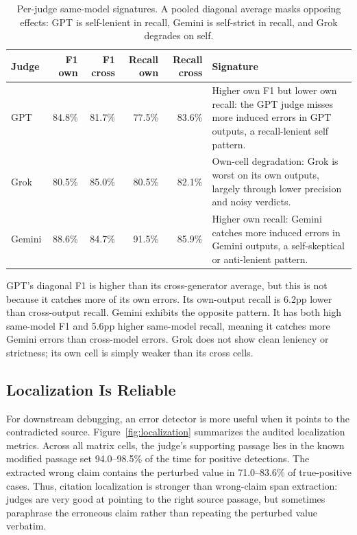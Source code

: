 \documentclass[11pt]{article}
\newcommand{\pp}{\ensuremath{\mathrm{pp}}\xspace}
\begin{document}
\begin{table}[t]
\centering
\small
\begin{tabularx}{\linewidth}{lrrrrY}
\toprule
\textbf{Judge} & \textbf{F1 own} & \textbf{F1 cross} & \textbf{Recall own} & \textbf{Recall cross} & \textbf{Signature} \\
\midrule
GPT & 84.8\% & 81.7\% & 77.5\% & 83.6\% & Higher own F1 but lower own recall: the GPT judge misses more induced errors in GPT outputs, a recall-lenient self pattern. \\
Grok & 80.5\% & 85.0\% & 80.5\% & 82.1\% & Own-cell degradation: Grok is worst on its own outputs, largely through lower precision and noisy verdicts. \\
Gemini & 88.6\% & 84.7\% & 91.5\% & 85.9\% & Higher own recall: Gemini catches more induced errors in Gemini outputs, a self-skeptical or anti-lenient pattern. \\
\bottomrule
\end{tabularx}
\caption{Per-judge same-model signatures. A pooled diagonal average masks opposing effects: GPT is self-lenient in recall, Gemini is self-strict in recall, and Grok degrades on self.}
\label{tab:bias_signatures}
\end{table}

GPT's diagonal F1 is higher than its cross-generator average, but this is not because it catches more of its own errors. Its own-output recall is 6.2\pp lower than cross-output recall. Gemini exhibits the opposite pattern. It has both high same-model F1 and 5.6\pp higher same-model recall, meaning it catches more Gemini errors than cross-model errors. Grok does not show clean leniency or strictness; its own cell is simply weaker than its cross cells.

\subsection{Localization Is Reliable}

For downstream debugging, an error detector is more useful when it points to the contradicted source. Figure~\ref{fig:localization} summarizes the audited localization metrics. Across all matrix cells, the judge's supporting passage lies in the known modified passage set 94.0--98.5\% of the time for positive detections. The extracted wrong claim contains the perturbed value in 71.0--83.6\% of true-positive cases. Thus, citation localization is stronger than wrong-claim span extraction: judges are very good at pointing to the right source passage, but sometimes paraphrase the erroneous claim rather than repeating the perturbed value verbatim.
\end{document}
